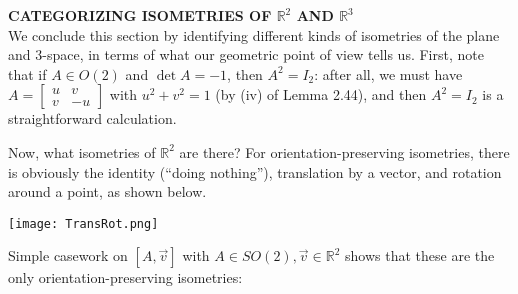 \documentclass[leqno]{book}
\begin{document}
\noindent\textbf{CATEGORIZING ISOMETRIES OF $\mathbb R^2$ AND $\mathbb R^3$}\\

\noindent We conclude this section by identifying different kinds of isometries of the plane and $3$-space, in terms of what our geometric point of view tells us.  First, note that if $A\in O(2)$ and $\det A=-1$, then $A^2=I_2$: after all, we must have $A=\begin{bmatrix}u&v\\v&-u\end{bmatrix}$ with $u^2+v^2=1$ (by (iv) of Lemma 2.44), and then $A^2=I_2$ is a straightforward calculation.

Now, what isometries of $\mathbb R^2$ are there?  For orientation-preserving isometries, there is obviously the identity (``doing nothing''), translation by a vector, and rotation around a point, as shown below.
\begin{center}\texttt{[image: TransRot.png]}\end{center}
Simple casework on $[A,\vec v]$ with $A\in SO(2),\vec v\in\mathbb R^2$ shows that these are the only orientation-preserving isometries:
\end{document}
